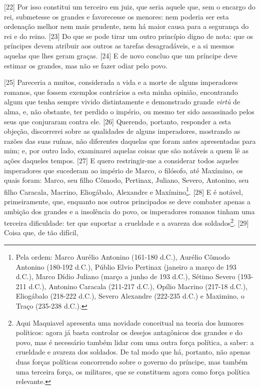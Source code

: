 {[}22{]} Por isso constitui um
terceiro em juiz, que seria aquele que, sem o encargo do rei, submetesse
os grandes e favorecesse os menores: nem poderia ser esta ordenação
melhor nem mais prudente, nem há maior causa para a segurança do rei e
do reino. {[}23{]} Do que se pode tirar um outro princípio digno de
nota: que os príncipes devem atribuir aos outros as tarefas
desagradáveis, e a si mesmos aquelas que lhes geram graças. {[}24{]} E
de novo concluo que um príncipe deve estimar os grandes, mas não se
fazer odiar pelo povo.

{[}25{]} Pareceria a muitos, considerada a vida e a morte de alguns
imperadores romanos, que fossem exemplos contrários a esta minha
opinião, encontrando algum que tenha sempre vivido distintamente e
demonstrado grande \emph{virtù} de alma, e, não obstante, ter perdido o
império, ou mesmo ter sido assassinado pelos seus que conjuraram contra
ele. {[}26{]} Querendo, portanto, responder a esta objeção, discorrerei
sobre as qualidades de alguns imperadores, mostrando as razões das suas
ruínas, não diferentes daquelas que foram antes apresentadas para mim;
e, por outro lado, examinarei aquelas coisas que são notáveis a quem lê
as ações daqueles tempos. {[}27{]} E quero restringir-me a considerar
todos aqueles imperadores que sucederam ao império de Marco, o filósofo,
até Maxímino, os quais foram: Marco, seu filho Cômodo, Pertinax,
Juliano, Severo, Antonino, seu filho Caracala, Macrino, Eliogábalo,
Alexandre e Maxímino\footnote{Pela ordem: Marco Aurélio Antonino
  (161-180 d.C.), Aurélio Cômodo Antonino (180-192 d.C.), Públio Elvio
  Pertinax (janeiro a março de 193 d.C.), Marco Dídio Juliano (março a
  junho de 193 d.C.), Sétimo Severo (193-211 d.C.), Antonino Caracala
  (211-217 d.C.), Opílio Macrino (217-18 d.C.), Eliogábalo (218-222
  d.C.), Severo Alexandre (222-235 d.C.) e Maximino, o Traço (235-238
  d.C.).}. {[}28{]} E é notável, primeiramente, que, enquanto nos outros
principados se deve combater apenas a ambição dos grandes e a insolência
do povo, os imperadores romanos tinham uma terceira dificuldade: ter que
suportar a crueldade e a avareza dos soldados\footnote{Aqui Maquiavel
  apresenta uma novidade conceitual na teoria dos humores políticos:
  agora já basta controlar os desejos antagônicos dos grandes e do povo,
  mas é necessário também lidar com uma outra força política, a saber: a
  crueldade e avareza dos soldados. De tal modo que há, portanto, não
  apenas duas forças políticas concorrendo sobre o governo do príncipe,
  mas também uma terceira força, os militares, que se constituem agora
  como força política relevante.}. {[}29{]} Coisa que, de tão difícil,
